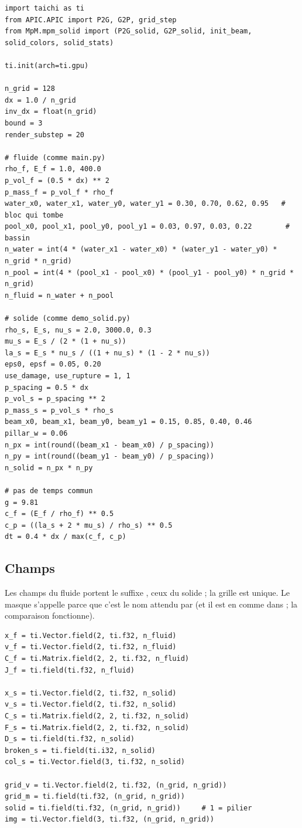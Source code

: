 \documentclass[11pt,a4paper]{article}
\newcommand{\code}[1]{\texttt{\detokenize{#1}}}
\begin{document}
\begin{lstlisting}
import taichi as ti
from APIC.APIC import P2G, G2P, grid_step
from MpM.mpm_solid import (P2G_solid, G2P_solid, init_beam, solid_colors, solid_stats)

ti.init(arch=ti.gpu)

n_grid = 128
dx = 1.0 / n_grid
inv_dx = float(n_grid)
bound = 3
render_substep = 20

# fluide (comme main.py)
rho_f, E_f = 1.0, 400.0
p_vol_f = (0.5 * dx) ** 2
p_mass_f = p_vol_f * rho_f
water_x0, water_x1, water_y0, water_y1 = 0.30, 0.70, 0.62, 0.95   # bloc qui tombe
pool_x0, pool_x1, pool_y0, pool_y1 = 0.03, 0.97, 0.03, 0.22        # bassin
n_water = int(4 * (water_x1 - water_x0) * (water_y1 - water_y0) * n_grid * n_grid)
n_pool = int(4 * (pool_x1 - pool_x0) * (pool_y1 - pool_y0) * n_grid * n_grid)
n_fluid = n_water + n_pool

# solide (comme demo_solid.py)
rho_s, E_s, nu_s = 2.0, 3000.0, 0.3
mu_s = E_s / (2 * (1 + nu_s))
la_s = E_s * nu_s / ((1 + nu_s) * (1 - 2 * nu_s))
eps0, epsf = 0.05, 0.20
use_damage, use_rupture = 1, 1
p_spacing = 0.5 * dx
p_vol_s = p_spacing ** 2
p_mass_s = p_vol_s * rho_s
beam_x0, beam_x1, beam_y0, beam_y1 = 0.15, 0.85, 0.40, 0.46
pillar_w = 0.06
n_px = int(round((beam_x1 - beam_x0) / p_spacing))
n_py = int(round((beam_y1 - beam_y0) / p_spacing))
n_solid = n_px * n_py

# pas de temps commun
g = 9.81
c_f = (E_f / rho_f) ** 0.5
c_p = ((la_s + 2 * mu_s) / rho_s) ** 0.5
dt = 0.4 * dx / max(c_f, c_p)
\end{lstlisting}

\subsection{Champs}

Les champs du fluide portent le suffixe \code{_f}, ceux du solide \code{_s} ; la grille est
unique. Le masque s'appelle \code{solid} parce que c'est le nom attendu par \code{grid_step}
(et il est en \code{ti.f32} comme dans \code{main.py} ; la comparaison \code{== 1} fonctionne).

\begin{lstlisting}
x_f = ti.Vector.field(2, ti.f32, n_fluid)
v_f = ti.Vector.field(2, ti.f32, n_fluid)
C_f = ti.Matrix.field(2, 2, ti.f32, n_fluid)
J_f = ti.field(ti.f32, n_fluid)

x_s = ti.Vector.field(2, ti.f32, n_solid)
v_s = ti.Vector.field(2, ti.f32, n_solid)
C_s = ti.Matrix.field(2, 2, ti.f32, n_solid)
F_s = ti.Matrix.field(2, 2, ti.f32, n_solid)
D_s = ti.field(ti.f32, n_solid)
broken_s = ti.field(ti.i32, n_solid)
col_s = ti.Vector.field(3, ti.f32, n_solid)

grid_v = ti.Vector.field(2, ti.f32, (n_grid, n_grid))
grid_m = ti.field(ti.f32, (n_grid, n_grid))
solid = ti.field(ti.f32, (n_grid, n_grid))     # 1 = pilier
img = ti.Vector.field(3, ti.f32, (n_grid, n_grid))
\end{lstlisting}
\end{document}
